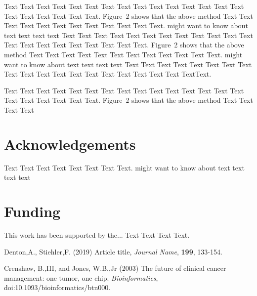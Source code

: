 \documentclass{bioinfo}
\begin{document}
Text Text Text Text Text Text Text Text Text Text Text Text Text
Text Text Text Text Text Text Text Text.
Figure~2\vphantom{\ref{fig:02}} shows\vadjust{\pagebreak} that the
above method  Text Text Text Text Text Text Text Text Text Text
Text Text.  \citealp{Boffelli03} might want to know about text
text text text Text Text Text Text Text Text  Text Text Text Text
Text Text Text Text Text Text Text Text Text Text Text.
Figure~2\vphantom{\ref{fig:02}} shows that the above method  Text
Text Text Text Text Text Text Text Text Text  Text Text.
\citealp{Boffelli03} might want to know about text text text text
Text Text Text Text Text Text  Text Text Text Text Text Text Text
Text Text Text Text Text Text Text\break Text.


Text Text Text Text Text Text  Text Text Text Text Text Text Text
Text Text  Text Text Text Text Text Text.
Figure~2\vphantom{\ref{fig:02}} shows that the above method  Text
Text Text Text\vspace*{-10pt}


\section*{Acknowledgements}

Text Text Text Text Text Text  Text Text.  \citealp{Boffelli03} might want to know about  text
text text text\vspace*{-12pt}

\section*{Funding}

This work has been supported by the... Text Text  Text Text.\vspace*{-12pt}

%
%
%
%
%
%
%
%
%


\begin{thebibliography}{}

Denton,A., Stiehler,F. (2019) Article title, {\it Journal Name}, {\bf 199}, 133-154.

Crenshaw, B.,III, and Jones, W.B.,Jr (2003) The future of clinical
cancer management: one tumor, one chip. \textit{Bioinformatics},
doi:10.1093/bioinformatics/btn000.

\end{thebibliography}
\end{document}

